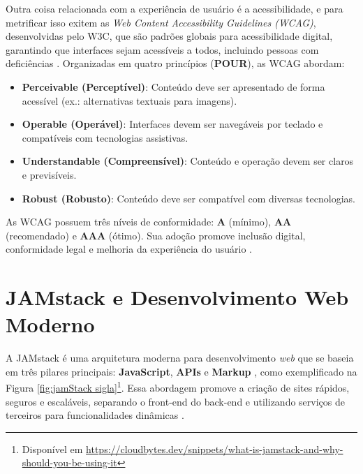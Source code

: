 {Outra coisa relacionada com a experiência de usuário é a acessibilidade, e para metrificar isso exitem as \textit{Web Content Accessibility Guidelines (WCAG)}, desenvolvidas pelo W3C, que são padrões globais para acessibilidade digital, garantindo que interfaces sejam acessíveis a todos, incluindo pessoas com deficiências \citep{wcag21}. Organizadas em quatro princípios (\textbf{POUR}), as WCAG abordam:

\begin{itemize}
    \item \textbf{Perceivable (Perceptível)}: Conteúdo deve ser apresentado de forma acessível (ex.: alternativas textuais para imagens).
    \item \textbf{Operable (Operável)}: Interfaces devem ser navegáveis por teclado e compatíveis com tecnologias assistivas.
    \item \textbf{Understandable (Compreensível)}: Conteúdo e operação devem ser claros e previsíveis.
    \item \textbf{Robust (Robusto)}: Conteúdo deve ser compatível com diversas tecnologias.
\end{itemize}

As WCAG possuem três níveis de conformidade: \textbf{A} (mínimo), \textbf{AA} (recomendado) e \textbf{AAA} (ótimo). Sua adoção promove inclusão digital, conformidade legal e melhoria da experiência do usuário \citep{wcag21}.



\section{JAMstack e Desenvolvimento Web Moderno}
\label{sec:jamstack}
A JAMstack é uma arquitetura moderna para desenvolvimento \textit{web} que se baseia em três pilares principais: \textbf{JavaScript}, \textbf{APIs} e \textbf{Markup} \citep{jamstackorg}, como exemplificado na Figura \ref{fig:jamStack sigla}\footnote{Disponível em \href{https://cloudbytes.dev/snippets/what-is-jamstack-and-why-should-you-be-using-it}{https://cloudbytes.dev/snippets/what-is-jamstack-and-why-should-you-be-using-it}}. Essa abordagem promove a criação de sites rápidos, seguros e escaláveis, separando o front-end do back-end e utilizando serviços de terceiros para funcionalidades dinâmicas \citep{netlifyjamstack}.

}
